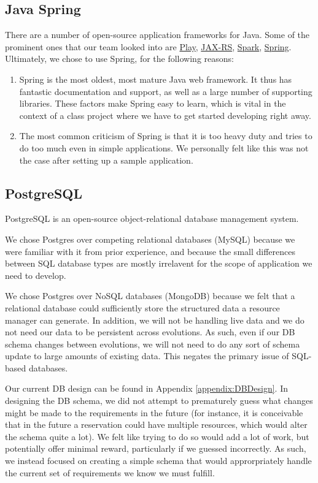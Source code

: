 \documentclass[12pt]{article}
\begin{document}
\subsection{Java Spring}
There are a number of open-source application frameworks for Java. Some of the prominent ones that our team looked into are \href{https://www.playframework.com/}{Play}, \href{https://jax-rs-spec.java.net/}{JAX-RS}, \href{http://sparkjava.com}{Spark}, \href{https://spring.io/}{Spring}. Ultimately, we chose to use Spring, for the following reasons:
\begin{enumerate}
    \item Spring is the most oldest, most mature Java web framework. It thus has fantastic documentation and support, as well as a large number of supporting libraries.  These factors make Spring easy to learn, which is vital in the context of a class project where we have to get started developing right away. 
    \item The most common criticism of Spring is that it is too heavy duty and tries to do too much even in simple applications. We personally felt like this was not the case after setting up a sample application.
\end{enumerate}

\subsection{PostgreSQL}
PostgreSQL is an open-source object-relational database management system. 

We chose Postgres over competing relational databases (MySQL) because we were familiar with it from prior experience, and because the small differences between SQL database types are mostly irrelavent for the scope of application we need to develop. 

We chose Postgres over NoSQL databases (MongoDB) because we felt that a relational database could sufficiently store the structured data a resource manager can generate. In addition, we will not be handling live data and we do not need our data to be persistent across evolutions. As such, even if our DB schema changes between evolutions, we will not need to do any sort of schema update to large amounts of existing data. This negates the primary issue of SQL-based databases. 

Our current DB design can be found in Appendix \ref{appendix:DBDesign}. In designing the DB schema, we did not attempt to prematurely guess what changes might be made to the requirements in the future (for instance, it is conceivable that in the future a reservation could have multiple resources, which would alter the schema quite a lot). We felt like trying to do so would add a lot of work, but potentially offer minimal reward, particularly if we guessed incorrectly. As such, we instead focused on creating a simple schema that would approrpriately handle the current set of requirements we know we must fulfill.  
\end{document}
